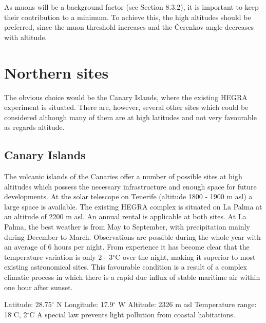 
\medskip As muons will be a background factor (see Section 8.3.2), it
is important to keep their contribution to a minimum. To achieve this, the
high altitudes should be preferred, since the muon threshold increases and
the \v{C}erenkov angle decreases with altitude.

\section{Northern sites}


\medskip The obvious choice would be the Canary Islands, where the existing
HEGRA experiment is situated. There are, however, several other sites which
could be considered although many of them are at high latitudes and not very
favourable as regards altitude.

\subsection{Canary Islands}


\medskip The volcanic islands of the Canaries offer a number of possible
sites at high altitudes which possess the necessary infrastructure and
enough space for future developments. At the solar telescope on Tenerife
(altitude 1800 - 1900 m asl) a large space is available. The existing HEGRA
complex is situated on La Palma at an altitude of 2200 m asl. An annual
rental is applicable at both sites. At La Palma, the best weather is from
May to September, with precipitation mainly during December to March.
Observations are possible during the whole year with an average of 6 hours
per night. From experience it has become clear that the temperature
variation is only 2 - 3$^\circ$C over the night, making it superior to most
existing astronomical sites. This favourable condition is a result of a
complex climatic process in which there is a rapid due influx of stable
maritime air within one hour after sunset.

\noindent
Latitude: 28.75$^\circ$ N \newline
Longitude: 17.9$^\circ$ W \newline
Altitude: 2326 m asl \newline
Temperature range: 18$^\circ$C, 2$^\circ$C \newline
A special law prevents light pollution from coastal habitations.

